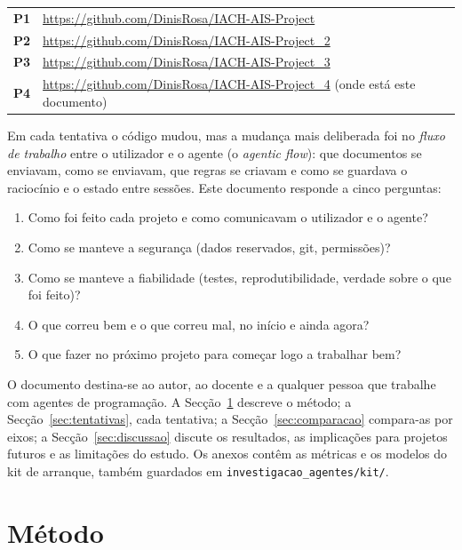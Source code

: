 \documentclass[11pt,a4paper]{article}
\newcommand{\Pum}{\textbf{P1}}
\newcommand{\Pdois}{\textbf{P2}}
\newcommand{\Ptres}{\textbf{P3}}
\newcommand{\Pquatro}{\textbf{P4}}
\begin{document}
\begin{center}\small
\begin{tabularx}{\linewidth}{@{}lL@{}}
\toprule
\Pum & \url{https://github.com/DinisRosa/IACH-AIS-Project}\\
\Pdois & \url{https://github.com/DinisRosa/IACH-AIS-Project_2}\\
\Ptres & \url{https://github.com/DinisRosa/IACH-AIS-Project_3}\\
\Pquatro & \url{https://github.com/DinisRosa/IACH-AIS-Project_4} (onde está este documento)\\
\bottomrule
\end{tabularx}
\end{center}

Em cada tentativa o código mudou, mas a mudança mais deliberada foi no \emph{fluxo de trabalho}
entre o utilizador e o agente (o \emph{agentic flow}): que documentos se enviavam, como se
enviavam, que regras se criavam e como se guardava o raciocínio e o estado entre sessões.
Este documento responde a cinco perguntas:

\begin{enumerate}[label=\textbf{Q\arabic*}]
  \item Como foi feito cada projeto e como comunicavam o utilizador e o agente?
  \item Como se manteve a segurança (dados reservados, git, permissões)?
  \item Como se manteve a fiabilidade (testes, reprodutibilidade, verdade sobre o que foi feito)?
  \item O que correu bem e o que correu mal, no início e ainda agora?
  \item O que fazer no próximo projeto para começar logo a trabalhar bem?
\end{enumerate}

O documento destina-se ao autor, ao docente e a qualquer pessoa que trabalhe com agentes de
programação. A Secção~\ref{sec:metodo} descreve o método; a Secção~\ref{sec:tentativas}, cada
tentativa; a Secção~\ref{sec:comparacao} compara-as por eixos; a Secção~\ref{sec:discussao}
discute os resultados, as implicações para projetos futuros e as limitações do estudo. Os anexos
contêm as métricas e os modelos do kit de arranque, também guardados em
\texttt{investigacao\_agentes/kit/}.

\section{Método}\label{sec:metodo}
\end{document}
